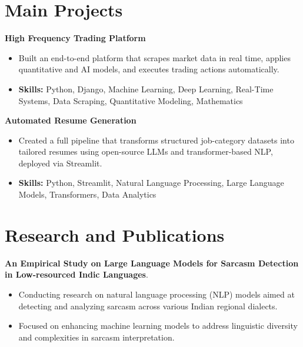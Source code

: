 \documentclass[a4paper,11pt]{article}
\begin{document}
\section{\textbf{Main Projects}}

\vspace{1mm}
  \textbf{High Frequency Trading Platform  }
\vspace{-1.5mm} %
\begin{itemize}
  \item Built an end-to-end platform that scrapes market data in real time, applies quantitative and AI models, and executes trading actions automatically.
\vspace{-3mm}
  \item \textbf{Skills:} Python, Django, Machine Learning, Deep Learning, Real-Time Systems, Data Scraping, Quantitative Modeling, Mathematics
\end{itemize}


\vspace{1mm}
   \textbf{Automated Resume Generation }
\vspace{-1.5mm} %
\begin{itemize}
  \item Created a full pipeline that transforms structured job-category datasets into tailored resumes using open-source LLMs and transformer-based NLP, deployed via Streamlit.
\vspace{-3mm}
  \item \textbf{Skills:} Python, Streamlit, Natural Language Processing, Large Language Models, Transformers, Data Analytics
\end{itemize}



\section{\textbf{Research and Publications} \hfill }
\vspace{1mm}
  \textbf{An Empirical Study on Large Language Models for Sarcasm Detection in Low-resourced Indic Languages}.
\vspace{-1mm} %
\begin{itemize}
  \item Conducting research on natural language processing (NLP) models aimed at detecting and analyzing sarcasm across various Indian regional dialects.
\vspace{-3mm}
  \item Focused on enhancing machine learning models to address linguistic diversity and complexities in sarcasm interpretation.
\end{itemize}
\end{document}
